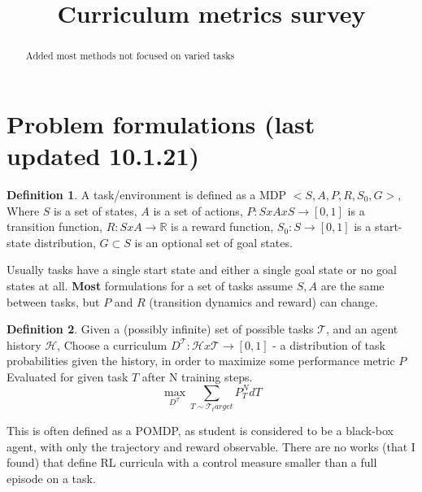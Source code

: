 \documentclass[letterpaper]{article}
\title{Curriculum metrics survey}
\theoremstyle{definition}
\newtheorem{defn}{Definition}[section]
\begin{document}
	\maketitle
	\begin{abstract}
		Added most methods not focused on varied tasks
	\end{abstract}

\tableofcontents

\section{Problem formulations (last updated 10.1.21)} \label{sec:formulation}
\begin{defn}
	A task/environment is defined as a MDP $<S,A,P,R,S_0,G>$,
	Where $S$ is a set of states, $A$ is a set of actions, $P:SxAxS\rightarrow [0,1]$ is a transition function, 
	$R:SxA\rightarrow \mathbb{R}$ is a reward function, $S_0:S\rightarrow [0,1]$ is a start-state distribution,
	$G\subset S$ is an optional set of goal states.
\end{defn}

Usually tasks have a single start state and either a single goal state or no goal states at all.
\textbf{Most} formulations for a set of tasks assume $S,A$ are the same between tasks, but $P$ and $R$ (transition dynamics and reward) can change.

\begin{defn} \label{defn:curriculum}
	Given a (possibly infinite) set of possible tasks $\mathcal{T}$, and an agent history $\mathcal{H}$, 
	Choose a curriculum $D^{\mathcal{T}}: \mathcal{H}x\mathcal{T}\rightarrow [0,1]$ - a distribution of task probabilities given the history,
	in order to maximize some performance metric $P$ Evaluated for given task $T$ after N training steps.
	\[
	\max_{D^{\mathcal{T}}} \sum_{T \sim \mathcal{T}_target} {P_T^N dT}
	\]

\end{defn}
This is often defined as a POMDP, as student is considered to be a black-box agent, with only the trajectory and reward observable.
There are no works (that I found) that define RL curricula with a control measure smaller than a full episode on a task.
\end{document}
